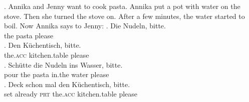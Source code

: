 \ex. Annika and Jenny want to cook pasta. Annika put a pot with water on the stove. Then she turned the stove on. After a few minutes, the water started to boil. Now Annika says to Jenny: \label{ex:scripts-rating-item}
     \ag.  Die Nudeln, bitte.\\
	  the pasta please\\
	   
     \bg. Den Küchentisch, bitte.\\
	  the.\textsc{acc} kitchen.table please\\
	   
     \cg. Schütte die Nudeln ins Wasser, bitte.\\
	  pour the pasta in.the water please\\
     \dg. Deck schon mal den Küchentisch, bitte.\\
	  set already \textsc{prt} the.\textsc{acc} kitchen.table please\\

